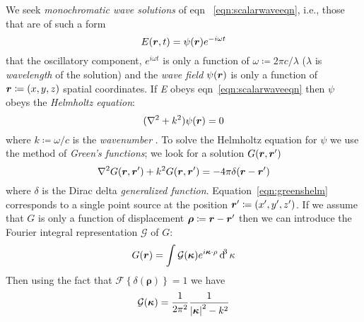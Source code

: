 We seek \textit{monochromatic wave solutions} of eqn ~\eqref{eqn:scalarwaveeqn}, i.e., those that are of such a form
%
\begin{equation}
    E(\rr, t) = \psi(\rr) e^{-i \omega t}\label{eqn:monochromsol}
\end{equation}
%
that the oscillatory component, \(e^{i \omega t}\) is only a function of \(\omega \coloneqq 2 \pi c / \lambda\) (\(\lambda\) is \textit{wavelength} of the solution) and the \textit{wave field} \(\psi(\bm{r})\) is only a function of \(\bm{r} \coloneqq (x, y, z)\) spatial coordinates.
%
If \textit{E} obeys eqn~\eqref{eqn:scalarwaveeqn} then \(\psi\) obeys the \textit{Helmholtz equation}:
%
\begin{equation}
    (\nabla^2 + k^2) \psi(\rr) = 0\label{eqn:helmholtz}
\end{equation}
%
where \(k \coloneqq \omega / c\) is the \textit{wavenumber} .
%
To solve the Helmholtz equation for \(\psi\) we use the method of \textit{Green's functions}; we look for a solution \(G(\bm{r}, \bm{r}')\)
%
\begin{equation}
    \nabla^2 G(\rr, \rr') + k^2 G(\rr, \rr') = -4 \pi \delta(\rr -\rr')\label{eqn:greenshelm}
\end{equation}
%
where \(\delta\) is the Dirac delta \textit{generalized function}.
%
Equation~\eqref{eqn:greenshelm} corresponds to a single point source at the position \(\bm{r}' \coloneqq (x', y', z')\).
%
If we assume that \(G\) is only a function of displacement \(\bm{\rho} \coloneqq \bm{r} - \bm{r}'\) then we can introduce the Fourier integral representation \(\mathcal{G}\) of \(G\):
%
\begin{equation}
   G(\rr) = \int\limits \mathcal{G}(\bm{\kappa})e^{i \bm{\kappa}\cdot \rho} \dif^{3}\kappa
\end{equation}
%
Then using the fact that \(\mathcal{F} \left\{ \delta(\bm{\rho}) \right\} = 1\) we have
%
\begin{equation}
    \mathcal{G}(\bm{\kappa}) = \frac{1}{2 \pi^2 } \frac{1}{\abs{\bm{\kappa}}^2 - k^2} 
\end{equation}